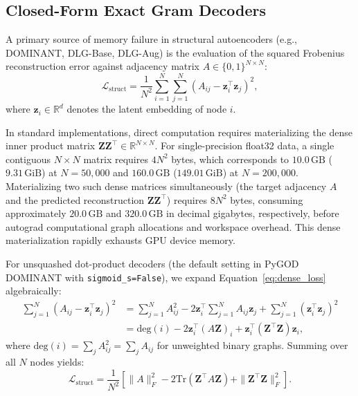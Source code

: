 \documentclass[applsci,article,submit,moreauthors,pdftex]{Definitions/mdpi}
\begin{document}
\subsection{Closed-Form Exact Gram Decoders}
A primary source of memory failure in structural autoencoders (e.g., DOMINANT, DLG-Base, DLG-Aug) is the evaluation of the squared Frobenius reconstruction error against adjacency matrix $A \in \{0, 1\}^{N \times N}$:
\begin{equation}
\mathcal{L}_{\mathrm{struct}} = \frac{1}{N^2} \sum_{i=1}^N \sum_{j=1}^N \left(A_{ij} - \mathbf{z}_i^\top \mathbf{z}_j\right)^2,
\label{eq:dense_loss}
\end{equation}
where $\mathbf{z}_i \in \mathbb{R}^d$ denotes the latent embedding of node $i$. 

In standard implementations, direct computation requires materializing the dense inner product matrix $\mathbf{Z} \mathbf{Z}^\top \in \mathbb{R}^{N \times N}$. For single-precision float32 data, a single contiguous $N \times N$ matrix requires $4 N^2$ bytes, which corresponds to $10.0\,\mathrm{GB}$ ($9.31\,\mathrm{GiB}$) at $N=50,000$ and $160.0\,\mathrm{GB}$ ($149.01\,\mathrm{GiB}$) at $N=200,000$. Materializing two such dense matrices simultaneously (the target adjacency $A$ and the predicted reconstruction $\mathbf{Z} \mathbf{Z}^\top$) requires $8 N^2$ bytes, consuming approximately $20.0\,\mathrm{GB}$ and $320.0\,\mathrm{GB}$ in decimal gigabytes, respectively, before autograd computational graph allocations and workspace overhead. This dense materialization rapidly exhausts GPU device memory.

For unsquashed dot-product decoders (the default setting in PyGOD DOMINANT with \texttt{sigmoid\_s=False}), we expand Equation~\eqref{eq:dense_loss} algebraically:
\begin{align}
\sum_{j=1}^N \left(A_{ij} - \mathbf{z}_i^\top \mathbf{z}_j\right)^2 &= \sum_{j=1}^N A_{ij}^2 - 2 \mathbf{z}_i^\top \sum_{j=1}^N A_{ij} \mathbf{z}_j + \sum_{j=1}^N (\mathbf{z}_i^\top \mathbf{z}_j)^2 \nonumber \\
&= \mathrm{deg}(i) - 2 \mathbf{z}_i^\top \left(A \mathbf{Z}\right)_i + \mathbf{z}_i^\top \left(\mathbf{Z}^\top \mathbf{Z}\right) \mathbf{z}_i,
\label{eq:gram_identity}
\end{align}
where $\mathrm{deg}(i) = \sum_j A_{ij}^2 = \sum_j A_{ij}$ for unweighted binary graphs. Summing over all $N$ nodes yields:
\begin{equation}
\mathcal{L}_{\mathrm{struct}} = \frac{1}{N^2} \left[ \|A\|_F^2 - 2 \mathrm{Tr}\left(\mathbf{Z}^\top A \mathbf{Z}\right) + \|\mathbf{Z}^\top \mathbf{Z}\|_F^2 \right].
\label{eq:exact_gram_loss}
\end{equation}
\end{document}
